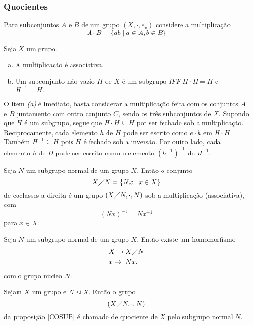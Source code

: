 \begin{definition}[Magma]
      \subsubsection{Quocientes}
         Para subconjuntos $A$ e $B$ de um grupo $(X,\cdot, e_{x})$ considere a multiplicação
         $$A \cdot B = \{ab \mid a \in A , b \in B\}$$
         \begin{stat}
            Seja $X$ um grupo.
            \begin{enumerate}[(a)]
               \item A multiplicação é associativa.
               \item Um subconjunto não vazio $H$ de $X$ é um subgrupo \emph{IFF} $H \cdot H = H$ e $H^{-1} = H.$
            \end{enumerate} 
         \end{stat}
         O item \emph{(a)} é imediato, basta considerar a multiplicação feita com os conjuntos $A$ e $B$ juntamento com outro conjunto $C$, sendo os três subconjuntos de $X$. Supondo que $H$ é um subgrupo, segue que $H\cdot H \subseteq H$ por ser fechado sob a multiplicação. Reciprocamente, cada elemento $h$ de $H$ pode ser escrito como $e\cdot h$ em $H\cdot H$.
         Também $H^{-1} \subseteq H$ pois $H$ é fechado sob a inversão. Por outro lado, cada elemento $h$ de $H$ pode ser escrito como o elemento $(h^{-1})^{-1}$ de $H^{-1}$.
         \begin{stat}\label{COSUB}
            Seja $N$ um subgrupo normal de um grupo $X$. Então o conjunto
            $$X \diagup N = \{Nx \mid x \in X\}$$ de coclasses a direita é um grupo $(X\diagup N, \cdot , N)$ sob a multiplicação (associativa), com $$(Nx)^{-1} = Nx^{-1}$$ para $x\in X$.
         \end{stat}
         \begin{corollary}\label{CORO1}
            Seja $N$ um subgrupo normal de um grupo $X$. Então existe um homomorfismo
            \begin{alignat}{2}
               &X \to X\diagup N \nonumber\\
               &x \mapsto\ Nx.
               \nonumber
            \end{alignat}
            com o grupo núcleo $N$.
         \end{corollary}
         \begin{definition}
            Sejam $X$ um grupo e $N \trianglelefteq X$. Então o grupo $$(X\diagup N, \cdot , N)$$ da proposição \ref{COSUB} é chamado de quociente de $X$ pelo subgrupo normal $N$.

\end{definition}
\end{definition}
